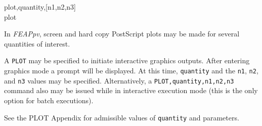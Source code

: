 \hspace{1.2cm} {{ plot,quantity,[n1,n2,n3] \hfill}} \\{\smallskip}
\hspace{1.0cm} {{ plot \hfill}}
\headb

In {\sl FEAPpv}, screen and hard copy PostScript plots may
be made for several quantities of interest.

A {\tt PLOT} may be specified to initiate interactive
graphics outputs.  After entering graphics mode a prompt
will be displayed.  At this time, {\tt quantity} and the {\tt n1},
{\tt n2}, and {\tt n3} values may be specified.
Alternatively, a
{\tt PLOT,quantity,n1,n2,n3} command also may be issued while in
interactive execution mode (this is the only option for batch executions).

See the PLOT Appendix for admissible values of {\tt quantity} and parameters.
\vfill\eject
